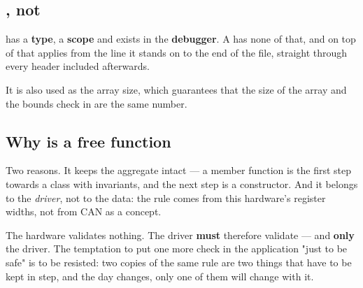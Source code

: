 \subsection{\texorpdfstring{}{static constexpr}, not \texorpdfstring{}{define}}

 has a \textbf{type}, a \textbf{scope} and exists in the \textbf{debugger}. A
 has none of that, and on top of that applies from the line it stands on to the end
of the file, straight through every header included afterwards.

It is also used as the array size, which guarantees that the size of the array and the bounds
check in  are the same number.

\subsection{Why \texorpdfstring{}{isValid()} is a free function}

Two reasons. It keeps the aggregate intact --- a member function is the first step towards a class
with invariants, and the next step is a constructor. And it belongs to the \emph{driver}, not to
the data: the rule comes from this hardware's register widths, not from CAN as a concept.

\begin{aside}
\note[Rule] The hardware validates nothing. The driver \textbf{must} therefore validate --- and
\textbf{only} the driver. The temptation to put one more check in the application "just to be
safe" is to be resisted: two copies of the same rule are two things that have to be kept in step,
and the day  changes, only one of them will change with it.
\end{aside}
